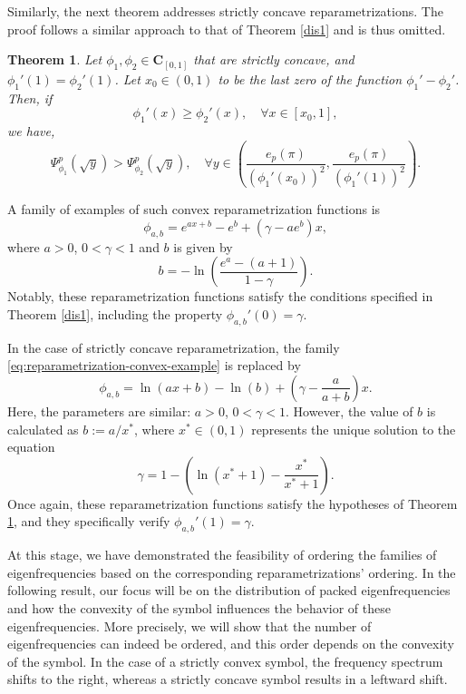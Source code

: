 \documentclass[11pt]{article}
\newtheorem{theorem}{Theorem}[section]
\begin{document}
 Similarly, the next theorem addresses strictly concave reparametrizations. The proof follows a similar approach to that of Theorem \ref{dis1} and is thus omitted.


\begin{theorem}\label{dis2}
Let $\phi_1, \phi_2 \in \mathbf{C}_{[0,1]}$ that are strictly concave, and  $\phi_1'(1) = \phi_2'(1)$. Let $x_0 \in (0, 1)$ to be the last zero of the function $\phi_1' - \phi_2'$. Then, if 
$$\phi_1'(x) \geq \phi_2'(x),\quad \forall x \in [x_0, 1],$$
we have, 
$$ 
\Psi_{\phi_1}^{p}(\sqrt{y}) > \Psi_{\phi_2}^{p}(\sqrt{y}), \quad \forall y \in \left(\frac{e_p(\pi)}{(\phi_1'(x_0))^2}, \frac{e_p(\pi)}{(\phi_1'(1))^2}\right).
$$
\end{theorem}


A family of examples of such convex reparametrization functions is 
\begin{equation}\label{eq:reparametrization-convex-example}
\phi_{a,b}=e^{ax+b}-e^b+(\gamma-ae^b)x,
\end{equation}
where $a >0$, $0<\gamma<1$ and $b$ is given by 
$$
b=-\ln\left(\frac{e^a-(a+1)}{1-\gamma}\right).
$$
Notably, these reparametrization functions satisfy the conditions specified in Theorem \ref{dis1}, including the property $\phi_{a,b}'(0) = \gamma$.  

In the case of strictly concave reparametrization, the family \eqref{eq:reparametrization-convex-example} is replaced by
\begin{equation}\label{eq:reparametrization-concave-example}
\phi_{a,b}=\ln(ax+b)-\ln(b)+\left(\gamma-\frac{a}{a+b}\right)x.
\end{equation}
Here, the parameters are similar: $a > 0$, $0 < \gamma < 1$. However, the value of $b$ is calculated as $b:=a/x^*$, where $x^* \in (0,1)$ represents the unique solution to the equation
$$
\gamma=1-\left(\ln(x^*+1)-\frac{x^*}{x^*+1}\right).
$$ 
Once again, these reparametrization functions satisfy the hypotheses of Theorem \ref{dis2}, and they specifically verify $\phi_{a,b}'(1)=\gamma$.

At this stage, we have demonstrated the feasibility of ordering the families of eigenfrequencies based on the corresponding reparametrizations' ordering. In the following result, our focus will be on the distribution of packed eigenfrequencies and how the convexity of the symbol influences the behavior of these eigenfrequencies. More precisely, we will show that the number of eigenfrequencies can indeed be ordered, and this order depends on the convexity of the symbol. In the case of a strictly convex symbol, the frequency spectrum shifts to the right, whereas a strictly concave symbol results in a leftward shift.
\end{document}
